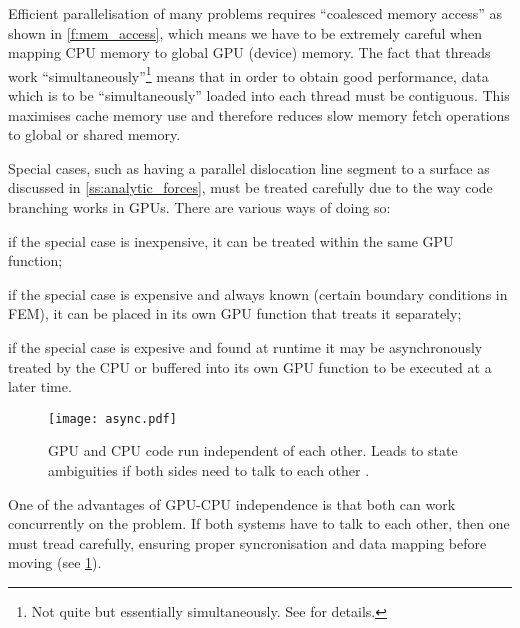 Efficient parallelisation of many problems requires ``coalesced memory access'' as shown in \cref{f:mem_access}, which means we have to be extremely careful when mapping CPU memory to global GPU (device) memory. The fact that threads work ``simultaneously''\footnote{Not quite but essentially simultaneously. See \cite{nvidia} for details.} means that in order to obtain good performance, data which is to be ``simultaneously'' loaded into each thread must be contiguous. This maximises cache memory use and therefore reduces slow memory fetch operations to global or shared memory.

Special cases, such as having a parallel dislocation line segment to a surface as discussed in \cref{ss:analytic_forces}, must be treated carefully due to the way code branching works in GPUs. There are various ways of doing so:
\begin{inparaenum}[\itshape 1\upshape)]
    \item if the special case is inexpensive, it can be treated within the same GPU function;
    \item if the special case is expensive and always known (certain boundary conditions in FEM), it can be placed in its own GPU function that treats it separately;
    \item if the special case is expesive and found at runtime it may be asynchronously treated by the CPU or buffered into its own GPU function to be executed at a later time.
\end{inparaenum}

\begin{figure}[t]
    \centering
    \texttt{[image: async.pdf]}
    \caption[GPU and CPU asynchronous execution.]{GPU and CPU code run independent of each other. Leads to state ambiguities if both sides need to talk to each other \cite{nvidia}.}
    \label{f:async_gpu_cpu}
\end{figure}
One of the advantages of GPU-CPU independence is that both can work concurrently on the problem. If both systems have to talk to each other, then one must tread carefully, ensuring proper syncronisation and data mapping before moving (see \cref{f:async_gpu_cpu}).

